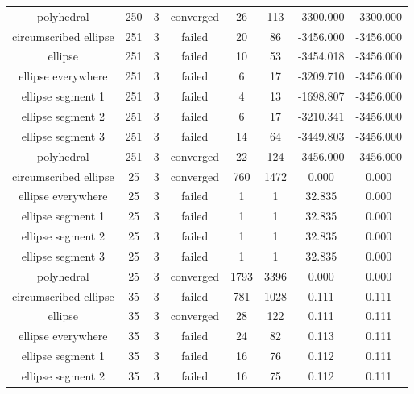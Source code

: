 \begin{footnotesize}
\begin{center}
\begin{longtable}{ c c c c c c c c }
        polyhedral        &  250  &  3  & converged  &   26  &  113  & -3300.000  & -3300.000  \\
  circumscribed ellipse   &  251  &  3  &   failed   &   20  &   86  & -3456.000  & -3456.000  \\
         ellipse          &  251  &  3  &   failed   &   10  &   53  & -3454.018  & -3456.000  \\
    ellipse everywhere    &  251  &  3  &   failed   &   6   &   17  & -3209.710  & -3456.000  \\
    ellipse segment 1     &  251  &  3  &   failed   &   4   &   13  & -1698.807  & -3456.000  \\
    ellipse segment 2     &  251  &  3  &   failed   &   6   &   17  & -3210.341  & -3456.000  \\
    ellipse segment 3     &  251  &  3  &   failed   &   14  &   64  & -3449.803  & -3456.000  \\
        polyhedral        &  251  &  3  & converged  &   22  &  124  & -3456.000  & -3456.000  \\
  circumscribed ellipse   &   25  &  3  & converged  &  760  &  1472 &   0.000    &   0.000    \\
    ellipse everywhere    &   25  &  3  &   failed   &   1   &   1   &   32.835   &   0.000    \\
    ellipse segment 1     &   25  &  3  &   failed   &   1   &   1   &   32.835   &   0.000    \\
    ellipse segment 2     &   25  &  3  &   failed   &   1   &   1   &   32.835   &   0.000    \\
    ellipse segment 3     &   25  &  3  &   failed   &   1   &   1   &   32.835   &   0.000    \\
        polyhedral        &   25  &  3  & converged  &  1793 &  3396 &   0.000    &   0.000    \\
  circumscribed ellipse   &   35  &  3  &   failed   &  781  &  1028 &   0.111    &   0.111    \\
         ellipse          &   35  &  3  & converged  &   28  &  122  &   0.111    &   0.111    \\
    ellipse everywhere    &   35  &  3  &   failed   &   24  &   82  &   0.113    &   0.111    \\
    ellipse segment 1     &   35  &  3  &   failed   &   16  &   76  &   0.112    &   0.111    \\
    ellipse segment 2     &   35  &  3  &   failed   &   16  &   75  &   0.112    &   0.111    \\

\end{longtable}
\end{center}
\end{footnotesize}
